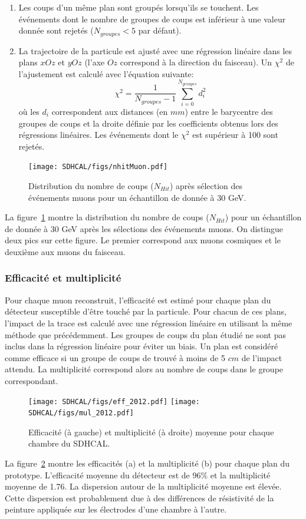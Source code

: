 \begin{enumerate}[-]
\item Les coups d'un même plan sont groupés lorsqu'ils se touchent. Les événements dont le nombre de groupes de coups est inférieur à une valeur donnée sont rejetés ($N_{groupes}<5$ par défaut).
\item La trajectoire de la particule est ajusté avec une régression linéaire dans les plans $xOz$ et $yOz$ (l'axe $Oz$ correspond à la direction du faisceau). Un $\chi^2$ de l'ajustement est calculé  avec l'équation suivante:
  \begin{equation}
    \chi^2=\frac{1}{N_{groupes}-1}\sum_{i=0}^{N_{groupes}}d_i^2
  \end{equation}
où les $d_i$ correspondent aux distances (en $mm$) entre le barycentre des groupes de coups et la droite définie par les coefficients obtenus lors des régressions linéaires. Les événements dont le $\chi^2$ est supérieur à 100 sont rejetés.
\end{enumerate}
\begin{figure}[!h]
  \begin{center}
    \texttt{[image: SDHCAL/figs/nhitMuon.pdf]}
    \caption{Distribution du nombre de coups ($N_{Hit}$) après sélection des événements muons pour un échantillon de donnée à 30 GeV.}
    \label{fig:nhitMuon}
  \end{center}
\end{figure}
La figure~\ref{fig:nhitMuon} montre la distribution du nombre de coups ($N_{Hit}$) pour un échantillon de donnée à 30 GeV après les sélections des événements muons. On distingue deux pics sur cette figure. Le premier correspond aux muons cosmiques et le deuxième aux muons du faisceau.
\subsubsection{Efficacité et multiplicité}
Pour chaque muon reconstruit, l'efficacité est estimé pour chaque plan du détecteur susceptible d'être touché par la particule. Pour chacun de ces plans, l'impact de la trace est calculé avec une régression linéaire en utilisant la même méthode que précédemment. Les groupes de coups du plan étudié ne sont pas inclus dans la régression linéaire pour éviter un biais. Un plan est considéré comme efficace si un groupe de coups de trouvé à moins de 5 $cm$ de l'impact attendu. La multiplicité correspond alors au nombre de coups dans le groupe correspondant. 
\begin{figure}[!h]
  \begin{center}
    \texttt{[image: SDHCAL/figs/eff\_2012.pdf]}
    \texttt{[image: SDHCAL/figs/mul\_2012.pdf]}
    \caption{Efficacité (à gauche) et multiplicité (à droite) moyenne pour chaque chambre du SDHCAL.}
    \label{fig:eff_and_multi}
  \end{center}
\end{figure}
La figure~\ref{fig:eff_and_multi} montre les efficacités (a) et la multiplicité (b) pour chaque plan du prototype. L'efficacité moyenne du détecteur est de 96$\%$ et la multiplicité moyenne de 1.76. La dispersion autour de la multiplicité moyenne est élevée. Cette dispersion est probablement due à des différences de résistivité de la peinture appliquée sur les électrodes d'une chambre à l'autre.
